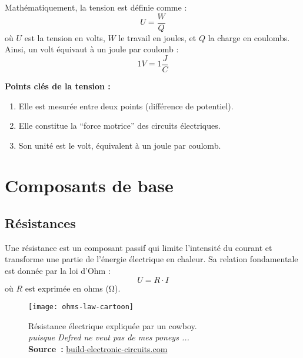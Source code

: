 Mathématiquement, la tension est définie comme :
\[
  U = \frac{W}{Q}
\]
où \(U\) est la tension en volts, \(W\) le travail en joules, et \(Q\) la charge
en coulombs. Ainsi, un volt équivaut à un joule par coulomb :
\[
1V=1\frac{J}{C}
\]


\vspace{\baselineskip}
\begin{Note}
\textbf{Points clés de la tension :}
\begin{enumerate}
  \item Elle est mesurée entre deux points (différence de potentiel).
  \item Elle constitue la “force motrice” des circuits électriques.
  \item Son unité est le volt, équivalent à un joule par coulomb.
\end{enumerate}
\end{Note}


\section{Composants de base} \label{subsec:basic_components}
\subsection{Résistances} \label{subsec:resistors}
Une résistance est un composant passif qui limite l’intensité du courant
et transforme une partie de l’énergie électrique en chaleur.
Sa relation fondamentale est donnée par la loi d’Ohm :
\[
U = R \cdot I
\]
où \(R\) est exprimée en ohms (\unit{\ohm}).

\begin{figure}[H]
    \centering
    \texttt{[image: ohms-law-cartoon]}
    \caption{
        \centering
        R\'esistance \'electrique expliqu\'ee par un cowboy. \\\emph{puisque Defred ne veut pas de mes poneys ...}\\
        \textbf{Source~:}
        \href{https://build-electronic-circuits.com/ohms-law}{build-electronic-circuits.com}
    }

\end{figure}


